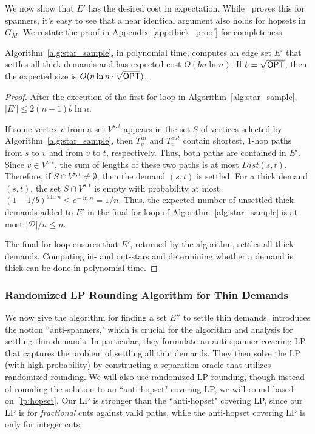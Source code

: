 We now show that $E'$ has the desired cost in expectation. While~\cite{DK11} proves this for spanners, it's easy to see that a near identical argument also holds for hopsets in $G_M$. We restate the proof \iflong \else in Appendix~\ref{app:thick_proof} \fi for completeness.

\begin{lemma} \label{lem:thick}
    Algorithm~\ref{alg:star_sample}, in polynomial time, computes an edge set $E'$ that settles all thick demands and has expected cost $O(bn\ln{n} )$. If $b = \sqrt{{{\sf OPT}}}$, then the expected size is $O(n\ln{n} \cdot \sqrt{{{\sf OPT}}})$.
\end{lemma}
\iflong
\begin{proof}  
    After the execution of the first for loop in Algorithm~\ref{alg:star_sample}, $|E'| \leq 2(n-1)b \ln{n}$.

    If some vertex $v$ from a set $V^{s,t}$ appears in the set $S$ of vertices selected by Algorithm~\ref{alg:star_sample}, then $T^{in}_v$ and $T^{out}_v$ contain shortest, $1$-hop paths from $s$ to $v$ and from $v$ to $t$, respectively. Thus, both paths are contained in $E'$. Since $v \in V^{s,t}$, the sum of lengths of these two paths is at most $Dist(s,t)$. Therefore, if $S \cap V^{s,t} \neq \emptyset$, then the demand $(s,t)$ is settled. For a thick demand $(s,t)$, the set $S \cap V^{s,t}$ is empty with probability at most $(1-1/b)^{b\ln{n}} \leq e^{-\ln{n}} = 1/n$. Thus, the expected number of unsettled thick demands added to $E'$ in the final for loop of Algorithm~\ref{alg:star_sample} is at most $|\mathcal{D}|/n \leq n$.

    The final for loop ensures that $E'$, returned by the algorithm, settles all thick demands. Computing in- and out-stars and determining whether a demand is thick can be done in polynomial time.
\end{proof}
\else
\fi


\subsubsection{Randomized LP Rounding Algorithm for Thin Demands} 
We now give the algorithm for finding a set $E''$ to settle thin demands. \cite{BBMRY11} introduces the notion ``anti-spanners," which is crucial for the algorithm and analysis for settling thin demands. In particular, they formulate an anti-spanner covering LP that captures the problem of settling all thin demands. They then solve the LP (with high probability) by constructing a separation oracle that utilizes randomized rounding. We will also use randomized LP rounding, though instead of rounding the solution to an ``anti-hopset" covering LP, we will round based on~\ref{lp:hopset}.  Our LP is stronger than the ``anti-hopset" covering LP, since our LP is for \textit{fractional} cuts against valid paths, while the anti-hopset covering LP is only for integer cuts.

